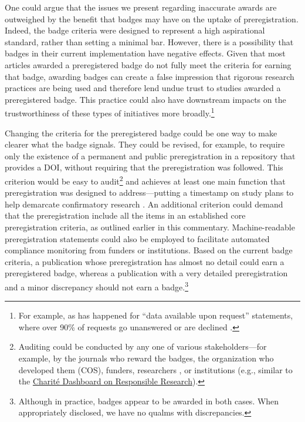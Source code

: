 \documentclass[authordate, meta]{jote-new-article}
\begin{document}
One could argue that the issues we present regarding inaccurate awards are outweighed by the benefit that badges may have on the uptake of preregistration. Indeed, the badge criteria were designed to represent a high aspirational standard, rather than setting a minimal bar. However, there is a possibility that badges in their current implementation have negative effects. Given that most articles awarded a preregistered badge do not fully meet the criteria for earning that badge, awarding badges can create a false impression that rigorous research practices are being used and therefore lend undue trust to studies awarded a preregistered badge. This practice could also have downstream impacts on the trustworthiness of these types of initiatives more broadly.\footnote{ For example, as has happened for “data available upon request” statements, where over 90\% of requests go unanswered or are declined \parencites{Gabelica2022}.}







Changing the criteria for the preregistered badge could be one way to make clearer what the badge signals. They could be revised, for example, to require only the existence of a permanent and public preregistration in a repository that provides a DOI, without requiring that the preregistration was followed. This criterion would be easy to audit\footnote{ Auditing could be conducted by any one of various stakeholders—for example, by the journals who reward the badges, the organization who developed them (COS), funders, researchers \parencites[e.g., similar to the \href{http://web.archive.org/save/https://fdaaa.trialstracker.net/}{FDAAA Trials Tracker}][]{DeVito2019}, or institutions (e.g., similar to the \href{http://web.archive.org/save/https://quest-dashboard.charite.de/}{Charité Dashboard on Responsible Research}).} and achieves at least one main function that preregistration was designed to address—putting a timestamp on study plans to help demarcate confirmatory research \parencites{Nosek2018}. An additional criterion could demand that the preregistration include all the items in an established core preregistration criteria, as outlined earlier in this commentary. Machine-readable preregistration statements could also be employed to facilitate automated compliance monitoring from funders or institutions. Based on the current badge criteria, a publication whose preregistration has almost no detail could earn a preregistered badge, whereas a publication with a very detailed preregistration and a minor discrepancy should not earn a badge.\footnote{ Although in practice, badges appear to be awarded in both cases. When appropriately disclosed, we have no qualms with discrepancies.}
\end{document}
